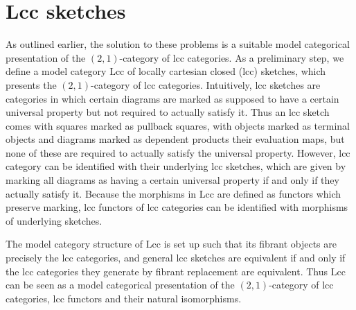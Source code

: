 \documentclass[a4paper]{article}
\theoremstyle{remark}
\theoremstyle{definition}
\begin{document}

\section{Lcc sketches}
\label{sec:lcc-sketches}

As outlined earlier, the solution to these problems is a suitable model categorical presentation of the $(2, 1)$-category of lcc categories.
As a preliminary step, we define a model category $\mathrm{Lcc}$ of locally cartesian closed (lcc) sketches, which presents the $(2, 1)$-category of lcc categories.
Intuitively, lcc sketches are categories in which certain diagrams are marked as supposed to have a certain universal property but not required to actually satisfy it.
Thus an lcc sketch comes with squares marked as pullback squares, with objects marked as terminal objects and diagrams marked as dependent products their evaluation maps, but none of these are required to actually satisfy the universal property.
However, lcc category can be identified with their underlying lcc sketches, which are given by marking all diagrams as having a certain universal property if and only if they actually satisfy it.
Because the morphisms in $\mathrm{Lcc}$ are defined as functors which preserve marking, lcc functors of lcc categories can be identified with morphisms of underlying sketches.

The model category structure of $\mathrm{Lcc}$ is set up such that its fibrant objects are precisely the lcc categories, and general lcc sketches are equivalent if and only if the lcc categories they generate by fibrant replacement are equivalent.
Thus $\mathrm{Lcc}$ can be seen as a model categorical presentation of the $(2, 1)$-category of lcc categories, lcc functors and their natural isomorphisms.
\end{document}
